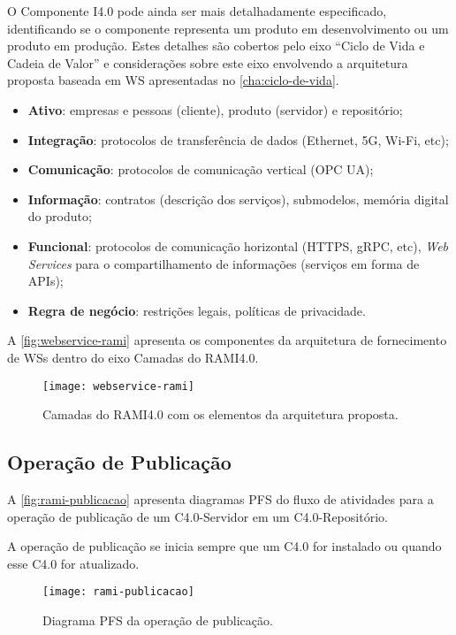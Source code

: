 O Componente I4.0 pode ainda ser mais detalhadamente especificado, identificando se o componente representa um produto em desenvolvimento ou um produto em produção. Estes detalhes são cobertos pelo eixo ``Ciclo de Vida e Cadeia de Valor'' e considerações sobre este eixo envolvendo a arquitetura proposta baseada em WS apresentadas no \autoref{cha:ciclo-de-vida}.

\begin{itemize}
	\item \textbf{Ativo}: empresas e pessoas (cliente), produto (servidor) e repositório;
	\item \textbf{Integração}: protocolos de transferência de dados (Ethernet, 5G, Wi-Fi, etc);
	\item \textbf{Comunicação}: protocolos de comunicação vertical (OPC UA);
	\item \textbf{Informação}: contratos (descrição dos serviços), submodelos, memória digital do produto;
	\item \textbf{Funcional}: protocolos de comunicação horizontal (HTTPS, gRPC, etc), \textit{Web Services} para o compartilhamento de informações (serviços em forma de APIs);
	\item \textbf{Regra de negócio}: restrições legais, políticas de privacidade.
\end{itemize}

A \autoref{fig:webservice-rami} apresenta os componentes da arquitetura de fornecimento de WSs dentro do eixo Camadas do RAMI4.0.%

\begin{figure}[H]
	\centering
	\texttt{[image: webservice-rami]}
	\caption{Camadas do RAMI4.0 com os elementos da arquitetura proposta.}
	\label{fig:webservice-rami}
\end{figure}

\subsection{Operação de Publicação}

A \autoref{fig:rami-publicacao} apresenta diagramas PFS do fluxo de atividades para a operação de publicação de um C4.0-Servidor em um C4.0-Repositório.

A operação de publicação se inicia sempre que um C4.0 for instalado ou quando esse C4.0 for atualizado.

\begin{figure}[htb]
	\centering
	\texttt{[image: rami-publicacao]}
	\caption{Diagrama PFS da operação de publicação.}
	\label{fig:rami-publicacao}
\end{figure}

